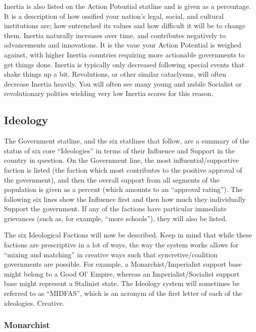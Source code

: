 \documentclass[11 pt]{scrartcl}
\begin{document}
Inertia is also listed on the Action Potential statline and is given as a percentage. It is a description of how ossified your nation's legal, social, and cultural institutions are; how entrenched its values and how difficult it will be to change them. Inertia naturally increases over time, and contributes negatively to advancements and innovations. It is the vaue your Action Potential is weighed against, with higher Inertia countries requiring more actionable governments to get things done. Inertia is typically only decreased following special events that shake things up a bit. Revolutions, or other similar cataclysms, will often decrease Inertia heavily. You will often see many young and nubile Socialist or revolutionary polities wielding very low Inertia scores for this reason.

\subsection{Ideology}

The Government statline, and the six statlines that follow, are a summary of the status of six core ``Ideologies''  in terms of their Influence and Support in the country in question. On the Government line, the most influential/supportive faction is listed (the faction which most contributes to the positive approval of the government), and then the overall support from all segments of the population is given as a percent (which amounts to an ``approval rating''). The following six lines show the Influence first and then how much they individually Support the government. If any of the factions have particular immediate grievances (such as, for example, ``more schools''), they will also be listed.

The six Ideological Factions will now be described. Keep in mind that while these factions are prescriptive in a lot of ways, the way the system works allows for “mixing and matching” in creative ways such that syncretive/coalition governments are possible. For example, a Monarchist/Imperialist support base might belong to a Good Ol’ Empire, whereas an Imperialist/Socialist support base might represent a Stalinist state. The Ideology system will sometimes be referred to as ``MIDFAS'', which is an acronym of the first letter of each of the ideologies. Creative.

\subsubsection*{Monarchist}
\end{document}
